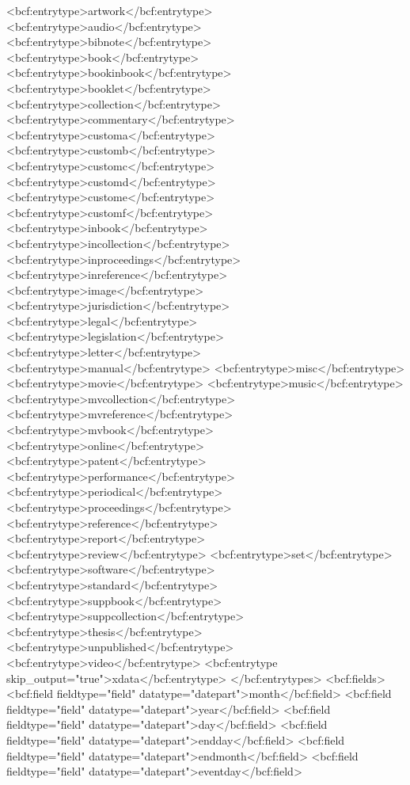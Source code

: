       <bcf:entrytype>artwork</bcf:entrytype>
      <bcf:entrytype>audio</bcf:entrytype>
      <bcf:entrytype>bibnote</bcf:entrytype>
      <bcf:entrytype>book</bcf:entrytype>
      <bcf:entrytype>bookinbook</bcf:entrytype>
      <bcf:entrytype>booklet</bcf:entrytype>
      <bcf:entrytype>collection</bcf:entrytype>
      <bcf:entrytype>commentary</bcf:entrytype>
      <bcf:entrytype>customa</bcf:entrytype>
      <bcf:entrytype>customb</bcf:entrytype>
      <bcf:entrytype>customc</bcf:entrytype>
      <bcf:entrytype>customd</bcf:entrytype>
      <bcf:entrytype>custome</bcf:entrytype>
      <bcf:entrytype>customf</bcf:entrytype>
      <bcf:entrytype>inbook</bcf:entrytype>
      <bcf:entrytype>incollection</bcf:entrytype>
      <bcf:entrytype>inproceedings</bcf:entrytype>
      <bcf:entrytype>inreference</bcf:entrytype>
      <bcf:entrytype>image</bcf:entrytype>
      <bcf:entrytype>jurisdiction</bcf:entrytype>
      <bcf:entrytype>legal</bcf:entrytype>
      <bcf:entrytype>legislation</bcf:entrytype>
      <bcf:entrytype>letter</bcf:entrytype>
      <bcf:entrytype>manual</bcf:entrytype>
      <bcf:entrytype>misc</bcf:entrytype>
      <bcf:entrytype>movie</bcf:entrytype>
      <bcf:entrytype>music</bcf:entrytype>
      <bcf:entrytype>mvcollection</bcf:entrytype>
      <bcf:entrytype>mvreference</bcf:entrytype>
      <bcf:entrytype>mvbook</bcf:entrytype>
      <bcf:entrytype>online</bcf:entrytype>
      <bcf:entrytype>patent</bcf:entrytype>
      <bcf:entrytype>performance</bcf:entrytype>
      <bcf:entrytype>periodical</bcf:entrytype>
      <bcf:entrytype>proceedings</bcf:entrytype>
      <bcf:entrytype>reference</bcf:entrytype>
      <bcf:entrytype>report</bcf:entrytype>
      <bcf:entrytype>review</bcf:entrytype>
      <bcf:entrytype>set</bcf:entrytype>
      <bcf:entrytype>software</bcf:entrytype>
      <bcf:entrytype>standard</bcf:entrytype>
      <bcf:entrytype>suppbook</bcf:entrytype>
      <bcf:entrytype>suppcollection</bcf:entrytype>
      <bcf:entrytype>thesis</bcf:entrytype>
      <bcf:entrytype>unpublished</bcf:entrytype>
      <bcf:entrytype>video</bcf:entrytype>
      <bcf:entrytype skip_output="true">xdata</bcf:entrytype>
    </bcf:entrytypes>
    <bcf:fields>
      <bcf:field fieldtype="field" datatype="datepart">month</bcf:field>
      <bcf:field fieldtype="field" datatype="datepart">year</bcf:field>
      <bcf:field fieldtype="field" datatype="datepart">day</bcf:field>
      <bcf:field fieldtype="field" datatype="datepart">endday</bcf:field>
      <bcf:field fieldtype="field" datatype="datepart">endmonth</bcf:field>
      <bcf:field fieldtype="field" datatype="datepart">eventday</bcf:field>
